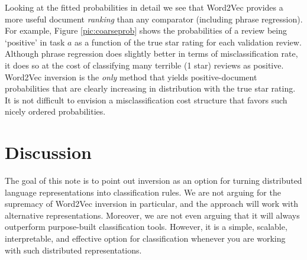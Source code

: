 \documentclass[11pt]{article}
\begin{document}
Looking at the fitted probabilities in detail we see that Word2Vec provides a
more useful document {\it ranking} than any comparator (including phrase
regression).  For example, Figure \ref{pic:coarseprob} shows the probabilities
of a review being `positive' in task $a$ as a function of the true star rating
for each validation review. Although phrase regression does slightly better in terms of misclassification rate, it does so at the cost of
classifying many terrible (1 star) reviews as positive.  Word2Vec inversion is
the {\it only} method that yields positive-document probabilities that are
clearly increasing in distribution with the true star rating.  It is not
difficult to envision a misclassification cost structure that favors such nicely ordered probabilities.

\section{Discussion}

The goal of this note is to point out inversion as an option for turning distributed language representations into classification rules.  We are not arguing for the supremacy of Word2Vec inversion in particular, and the approach will work with alternative representations.  Moreover, we are not even arguing that it will always outperform purpose-built classification tools.  However, it is a simple, scalable, interpretable, and effective option for classification whenever you are working with such distributed representations.



\end{document}
